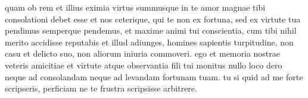  quam ob rem et illius eximia virtus summusque in te amor magnae tibi consolationi debet esse et nos ceterique, qui te non ex fortuna, sed ex virtute tua pendimus semperque pendemus, et maxime animi tui conscientia, cum tibi nihil merito accidisse reputabis et illud adiunges, homines sapientis turpitudine, non casu et delicto suo, non aliorum iniuria commoveri. ego et memoria nostrae veteris amicitiae et virtute atque observantia fili tui monitus nullo loco dero neque ad consolandam neque ad levandam fortunam tuam. tu si quid ad me forte scripseris, perficiam ne te frustra scripsisse arbitrere.
